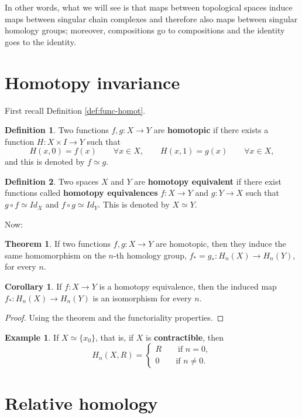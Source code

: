 \documentclass{book}
\theoremstyle{definition}
\newtheorem*{defn}{Definition}
\newtheorem*{teo}{Theorem}
\newtheorem*{coro}{Corollary}
\newtheorem*{ejem}{Example}
\begin{document}
In other words, what we will see is that maps between
topological spaces induce maps between singular chain
complexes and therefore also maps between singular homology
groups; moreover, compositions go to compositions and the
identity goes to the identity.

\section{Homotopy invariance}

First recall Definition \ref{def:func-homot}.

\begin{defn}
Two functions $f,g:X\to Y$ are \textbf{homotopic} if there
exists a function $H:X\times I\to Y$ such that
$$
H(x,0)=f(x)\qquad\forall x\in X,
\qquad
H(x,1)=g(x)\qquad\forall x\in X,
$$
and this is denoted by $f\simeq g$.
\end{defn}

\begin{defn}
Two spaces $X$ and $Y$ are \textbf{homotopy equivalent} if
there exist functions called \textbf{homotopy equivalences}
$f:X\to Y$ and $g:Y\to X$ such that
$g\circ f\simeq Id_X$ and $f\circ g\simeq Id_Y$. This is
denoted by $X\simeq Y$.
\end{defn}

Now:

\begin{teo}
If two functions $f,g:X\to Y$ are homotopic, then they induce
the same homomorphism on the $n$-th homology group,
$f_*=g_*:H_n(X)\to H_n(Y)$, for every $n$.
\end{teo}

\begin{coro}
If $f:X\to Y$ is a homotopy equivalence, then the induced map
$f_*:H_n(X)\to H_n(Y)$ is an isomorphism for every $n$.
\end{coro}

\begin{proof}
Using the theorem and the functoriality properties.
\end{proof}

\begin{ejem}
If $X\simeq\{x_0\}$, that is, if $X$ is
\textbf{contractible}, then
$$
H_n(X,R)=
\begin{cases}
R\qquad\text{if }n=0,\\
0\qquad\text{if }n\neq0.
\end{cases}
$$
\end{ejem}


\section{Relative homology}
\end{document}
